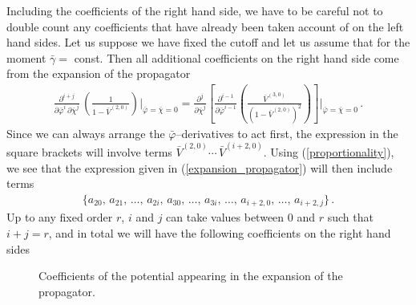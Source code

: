 \documentclass[11pt]{book} %
\numberwithin{equation}{chapter}
\begin{document}
Including the coefficients of the right hand side,
we have to be careful not to double count any coefficients that have already been taken account of on the
left hand sides. Let us suppose we have fixed the cutoff and let us assume that for the
moment $\bar{\gamma} =$ const. Then all additional coefficients on the right hand side come from the
expansion of the propagator
\begin{align}
  \label{expansion_propagator}
  \frac{\partial^{i+j}}{\partial \bar\varphi^i \, \partial \bar\chi^j} \, \left( \frac{1}{1 - \bar V^{(2,0)}} \right) \bigg|_{\bar\varphi = \bar\chi = 0} =
  \frac{\partial^{j}}{\partial \bar\chi^j} \left[ \frac{\partial^{i-1}}{\partial \bar\varphi^{i-1}} \left( \frac{\bar V^{(3,0)}}{(1 - \bar V^{(2,0)})^2} \right) \right] \Bigg|_{\bar\varphi = \bar\chi = 0}\, .
\end{align}
Since we can always arrange the $\bar\varphi$--derivatives to act first,
the expression in the square brackets will involve terms $\bar V^{(2,0)} \cdots \, \bar V^{(i+2,0)}$.
Using (\ref{proportionality}), we see that the expression given in (\ref{expansion_propagator}) will
then include terms
\begin{align}
  \bigg\lbrace
  a_{20},\, a_{21},\, \dots ,\, a_{2i},\, a_{30},\, \dots ,\, a_{3i},\, \dots,\, a_{i+2,0},\, \dots,\, a_{i+2,j}
  \bigg\rbrace \,.
\end{align}
Up to any fixed order $r$, $i$ and $j$ can take values between $0$ and $r$ such that $i+j = r$,
and in total we will have the following coefficients on the right hand sides
\begin{figure}
\centering
{}
\caption{Coefficients of the potential appearing in the expansion of the propagator.}
\label{diag_rhs}
\end{figure}
\end{document}
